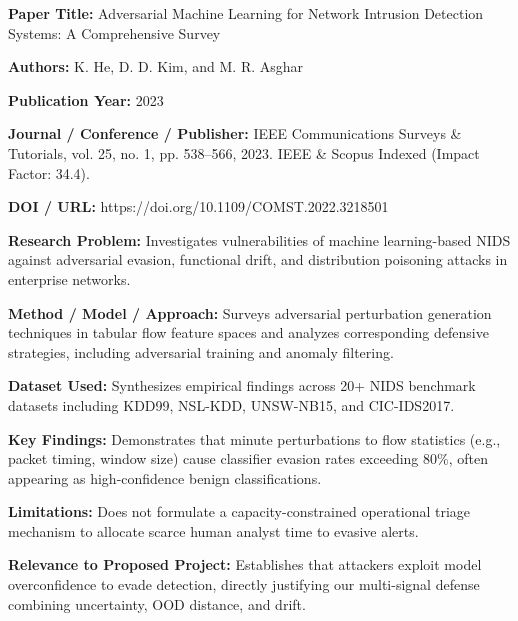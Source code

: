 \textbf{Paper Title:} Adversarial Machine Learning for Network Intrusion Detection Systems: A Comprehensive Survey

\textbf{Authors:} K. He, D. D. Kim, and M. R. Asghar

\textbf{Publication Year:} 2023

\textbf{Journal / Conference / Publisher:} IEEE Communications Surveys \& Tutorials, vol. 25, no. 1, pp. 538--566, 2023. IEEE \& Scopus Indexed (Impact Factor: 34.4).

\textbf{DOI / URL:} https://doi.org/10.1109/COMST.2022.3218501

\textbf{Research Problem:} Investigates vulnerabilities of machine learning-based NIDS against adversarial evasion, functional drift, and distribution poisoning attacks in enterprise networks.

\textbf{Method / Model / Approach:} Surveys adversarial perturbation generation techniques in tabular flow feature spaces and analyzes corresponding defensive strategies, including adversarial training and anomaly filtering.

\textbf{Dataset Used:} Synthesizes empirical findings across 20+ NIDS benchmark datasets including KDD99, NSL-KDD, UNSW-NB15, and CIC-IDS2017.

\textbf{Key Findings:} Demonstrates that minute perturbations to flow statistics (e.g., packet timing, window size) cause classifier evasion rates exceeding 80\%, often appearing as high-confidence benign classifications.

\textbf{Limitations:} Does not formulate a capacity-constrained operational triage mechanism to allocate scarce human analyst time to evasive alerts.

\textbf{Relevance to Proposed Project:} Establishes that attackers exploit model overconfidence to evade detection, directly justifying our multi-signal defense combining uncertainty, OOD distance, and drift.

